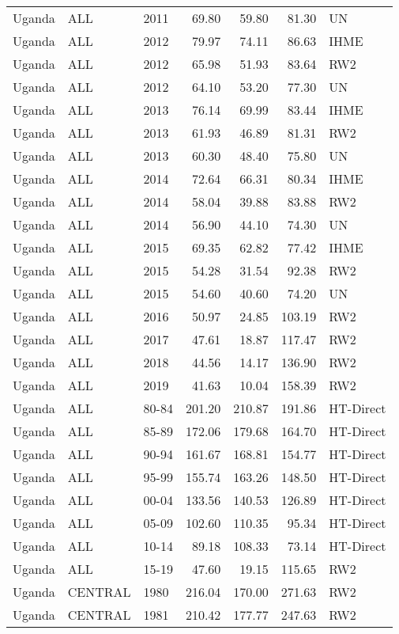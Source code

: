 \begin{longtable}{lllrrrl}
  Uganda & ALL & 2011 & 69.80 & 59.80 & 81.30 & UN \\ 
  Uganda & ALL & 2012 & 79.97 & 74.11 & 86.63 & IHME \\ 
  Uganda & ALL & 2012 & 65.98 & 51.93 & 83.64 & RW2 \\ 
  Uganda & ALL & 2012 & 64.10 & 53.20 & 77.30 & UN \\ 
  Uganda & ALL & 2013 & 76.14 & 69.99 & 83.44 & IHME \\ 
  Uganda & ALL & 2013 & 61.93 & 46.89 & 81.31 & RW2 \\ 
  Uganda & ALL & 2013 & 60.30 & 48.40 & 75.80 & UN \\ 
  Uganda & ALL & 2014 & 72.64 & 66.31 & 80.34 & IHME \\ 
  Uganda & ALL & 2014 & 58.04 & 39.88 & 83.88 & RW2 \\ 
  Uganda & ALL & 2014 & 56.90 & 44.10 & 74.30 & UN \\ 
  Uganda & ALL & 2015 & 69.35 & 62.82 & 77.42 & IHME \\ 
  Uganda & ALL & 2015 & 54.28 & 31.54 & 92.38 & RW2 \\ 
  Uganda & ALL & 2015 & 54.60 & 40.60 & 74.20 & UN \\ 
  Uganda & ALL & 2016 & 50.97 & 24.85 & 103.19 & RW2 \\ 
  Uganda & ALL & 2017 & 47.61 & 18.87 & 117.47 & RW2 \\ 
  Uganda & ALL & 2018 & 44.56 & 14.17 & 136.90 & RW2 \\ 
  Uganda & ALL & 2019 & 41.63 & 10.04 & 158.39 & RW2 \\ 
  Uganda & ALL & 80-84 & 201.20 & 210.87 & 191.86 & HT-Direct \\ 
  Uganda & ALL & 85-89 & 172.06 & 179.68 & 164.70 & HT-Direct \\ 
  Uganda & ALL & 90-94 & 161.67 & 168.81 & 154.77 & HT-Direct \\ 
  Uganda & ALL & 95-99 & 155.74 & 163.26 & 148.50 & HT-Direct \\ 
  Uganda & ALL & 00-04 & 133.56 & 140.53 & 126.89 & HT-Direct \\ 
  Uganda & ALL & 05-09 & 102.60 & 110.35 & 95.34 & HT-Direct \\ 
  Uganda & ALL & 10-14 & 89.18 & 108.33 & 73.14 & HT-Direct \\ 
  Uganda & ALL & 15-19 & 47.60 & 19.15 & 115.65 & RW2 \\ 
  Uganda & CENTRAL & 1980 & 216.04 & 170.00 & 271.63 & RW2 \\ 
  Uganda & CENTRAL & 1981 & 210.42 & 177.77 & 247.63 & RW2 \\ 

\end{longtable}
